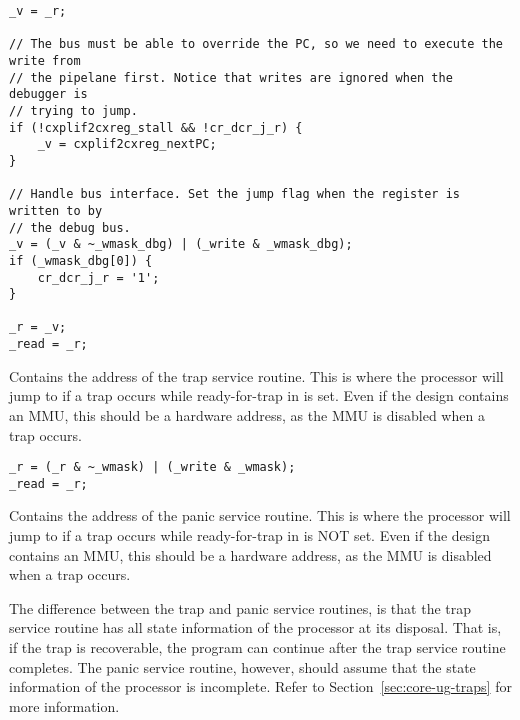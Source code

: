 \declaration{}
\implementation{}
\begin{lstlisting}
_v = _r;

// The bus must be able to override the PC, so we need to execute the write from
// the pipelane first. Notice that writes are ignored when the debugger is
// trying to jump.
if (!cxplif2cxreg_stall && !cr_dcr_j_r) {
    _v = cxplif2cxreg_nextPC;
}

// Handle bus interface. Set the jump flag when the register is written to by
// the debug bus.
_v = (_v & ~_wmask_dbg) | (_write & _wmask_dbg);
if (_wmask_dbg[0]) {
    cr_dcr_j_r = '1';
}

_r = _v;
_read = _r;

\end{lstlisting}


Contains the address of the trap service routine. This is where the processor
will jump to if a trap occurs while ready-for-trap in  is set. Even if
the design contains an MMU, this should be a hardware address, as the MMU is
disabled when a trap occurs.

\declaration{}
\implementation{}
\begin{lstlisting}
_r = (_r & ~_wmask) | (_write & _wmask);
_read = _r;
\end{lstlisting}


Contains the address of the panic service routine. This is where the processor
will jump to if a trap occurs while ready-for-trap in  is NOT set.
Even if the design contains an MMU, this should be a hardware address, as the
MMU is disabled when a trap occurs.

The difference between the trap and panic service routines, is that the trap
service routine has all state information of the processor at its disposal. That
is, if the trap is recoverable, the program can continue after the trap service
routine completes. The panic service routine, however, should assume that the
state information of the processor is incomplete. Refer to
Section~\ref{sec:core-ug-traps} for more information.


